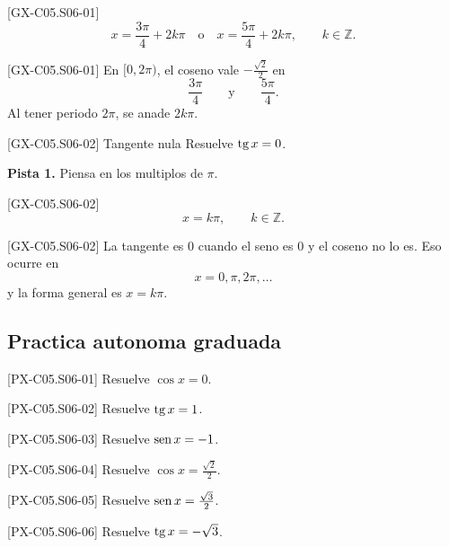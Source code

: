 \begin{shortanswer}{[GX-C05.S06-01]}
\[
x=\frac{3\pi}{4}+2k\pi
\quad \text{o} \quad
x=\frac{5\pi}{4}+2k\pi,
\qquad k\in\mathbb{Z}.
\]
\end{shortanswer}

\begin{fullsolution}{[GX-C05.S06-01]}
En \([0,2\pi)\), el coseno vale \(-\frac{\sqrt{2}}{2}\) en
\[
\frac{3\pi}{4}
\qquad \text{y} \qquad
\frac{5\pi}{4}.
\]
Al tener periodo \(2\pi\), se anade \(2k\pi\).
\end{fullsolution}

\begin{guidedexercise}{[GX-C05.S06-02] Tangente nula}
Resuelve \(\operatorname{tg} x=0\).

\textbf{Pista 1.} Piensa en los multiplos de \(\pi\).
\end{guidedexercise}

\begin{shortanswer}{[GX-C05.S06-02]}
\[
x=k\pi,
\qquad k\in\mathbb{Z}.
\]
\end{shortanswer}

\begin{fullsolution}{[GX-C05.S06-02]}
La tangente es \(0\) cuando el seno es \(0\) y el coseno no lo es. Eso ocurre en
\[
x=0,\pi,2\pi,\ldots
\]
y la forma general es \(x=k\pi\).
\end{fullsolution}

\subsection*{Practica autonoma graduada}
\begin{exercise}{[PX-C05.S06-01] Resuelve \(\cos x=0\).}
\end{exercise}
\begin{exercise}{[PX-C05.S06-02] Resuelve \(\operatorname{tg} x=1\).}
\end{exercise}
\begin{exercise}{[PX-C05.S06-03] Resuelve \(\operatorname{sen} x=-1\).}
\end{exercise}
\begin{exercise}{[PX-C05.S06-04] Resuelve \(\cos x=\frac{\sqrt{2}}{2}\).}
\end{exercise}
\begin{exercise}{[PX-C05.S06-05] Resuelve \(\operatorname{sen} x=\frac{\sqrt{3}}{2}\).}
\end{exercise}
\begin{exercise}{[PX-C05.S06-06] Resuelve \(\operatorname{tg} x=-\sqrt{3}\).}
\end{exercise}


